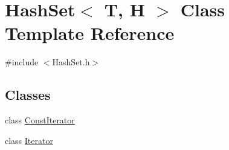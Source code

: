 \hypertarget{class_hash_set}{
\section{HashSet$<$ T, H $>$ Class Template Reference}
\label{class_hash_set}
}


{\ttfamily \#include $<$HashSet.h$>$}

\subsection*{Classes}
\begin{DoxyCompactItemize}
\item 
class \hyperlink{class_hash_set_1_1_const_iterator}{ConstIterator}
\item 
class \hyperlink{class_hash_set_1_1_iterator}{Iterator}
\end{DoxyCompactItemize}
